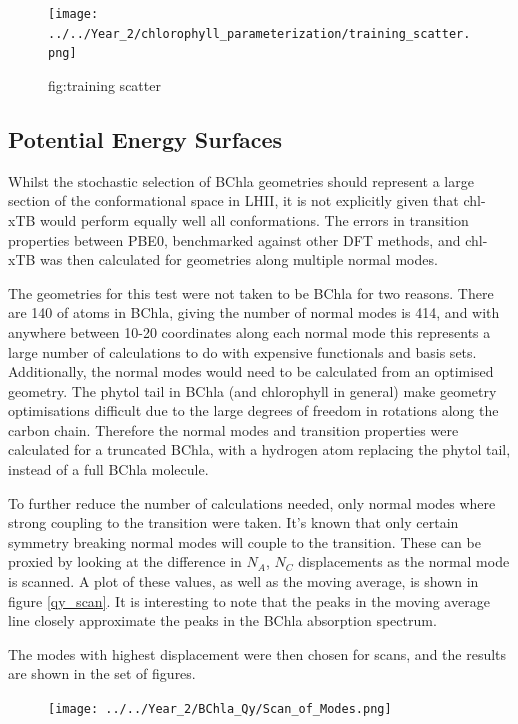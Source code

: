 \begin{figure}
    \texttt{[image: ../../Year\_2/chlorophyll\_parameterization/training\_scatter.png]}
    \caption{fig:training scatter}
\end{figure}

\subsection{Potential Energy Surfaces}
\label{subsec:pot_energy_surfaces}

Whilst the stochastic selection of BChla geometries should represent a large section 
of the conformational space in LHII, it is not explicitly given that chl-xTB would
perform equally well all conformations. The errors in transition properties between
PBE0, benchmarked against other DFT methods, and chl-xTB was then calculated for
geometries along multiple normal modes.

The geometries for this test were not taken to be BChla for two reasons. There are
140 of atoms in BChla, giving the number of normal modes is 414, and with
anywhere between 10-20 coordinates along each normal mode this represents a large
number of calculations to do with expensive functionals and basis sets. Additionally,
the normal modes would need to be calculated from an optimised geometry. The phytol
tail in BChla (and chlorophyll in general) make geometry optimisations difficult
due to the large degrees of freedom in rotations along the carbon chain. Therefore
the normal modes and transition properties were calculated for a truncated BChla, 
with a hydrogen atom replacing the phytol tail, instead of a full BChla molecule.

To further reduce the number of calculations needed, only normal modes where strong
coupling to the \Qy transition were taken. It's known that only certain symmetry 
breaking normal modes will couple to the \Qy transition. These can be proxied
by looking at the difference in $N_A$, $N_C$ displacements as the normal mode
is scanned. A plot of these values, as well as the moving average, is shown in figure
\ref{qy_scan}. It is interesting to note that the peaks in the moving average line
closely approximate the peaks in the BChla absorption spectrum.

The modes with highest displacement were then chosen for scans, and the results
are shown in the set of figures.

\begin{figure}
    \texttt{[image: ../../Year\_2/BChla\_Qy/Scan\_of\_Modes.png]}
    \label{fig:qy_scan}
\end{figure}

